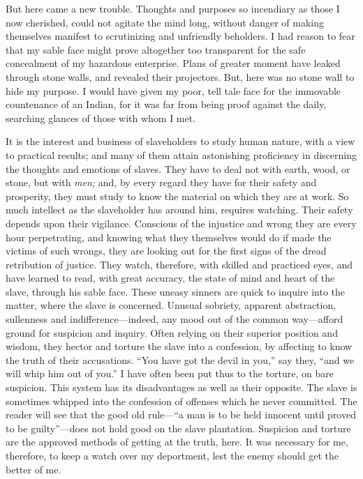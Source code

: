 But here came a new trouble. Thoughts and purposes so incendiary as
those I now cherished, could not agitate the mind long, without danger
of making themselves manifest to scrutinizing and unfriendly beholders.
I had reason to fear that my sable face might prove altogether too
transparent for the safe concealment of my hazardous enterprise. Plans
of greater moment have leaked through stone walls, and revealed their
projectors. But, here was no stone wall to hide my purpose. I would have
given my poor, tell tale face for the immovable countenance of an
Indian, for it was far from being proof against the daily, searching
glances of those with whom I met.

It is the interest and business of slaveholders to study human nature,
with a view to practical results; and many of them attain astonishing
proficiency in discerning the thoughts and emotions of slaves. They have
to deal not with earth, wood, or stone, but with
{\protect\hypertarget{277}{}{}}\emph{men;} and, by every regard they
have for their safety and prosperity, they must study to know the
material on which they are at work. So much intellect as the slaveholder
has around him, requires watching. Their safety depends upon their
vigilance. Conscious of the injustice and wrong they are every hour
perpetrating, and knowing what they themselves would do if made the
victims of such wrongs, they are looking out for the first signs of the
dread retribution of justice. They watch, therefore, with skilled and
practiced eyes, and have learned to read, with great accuracy, the state
of mind and heart of the slave, through his sable face. These uneasy
sinners are quick to inquire into the matter, where the slave is
concerned. Unusual sobriety, apparent abstraction, sullenness and
indifference---indeed, any mood out of the common way---afford ground
for suspicion and inquiry. Often relying on their superior position and
wisdom, they hector and torture the slave into a confession, by
affecting to know the truth of their accusations. ``You have got the
devil in you,'' say they, ``and we will whip him out of you.'' I have
often been put thus to the torture, on bare suspicion. This system has
its disadvantages as well as their opposite. The slave is sometimes
whipped into the confession of offenses which he never committed. The
reader will see that the good old rule---``a man is to be held innocent
until proved to be guilty''---does not hold good on the slave
plantation. Suspicion and torture are the approved methods of getting at
the truth, here. It was necessary for me, therefore, to
{\protect\hypertarget{278}{}{}}keep a watch over my deportment, lest the
enemy should get the better of me.

